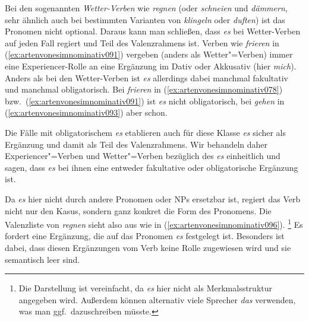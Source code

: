 
Bei den sogenannten \textit{Wetter-Verben} wie \textit{regnen} (oder \textit{schneien} und \textit{dämmern}, sehr ähnlich auch bei bestimmten Varianten von \textit{klingeln} oder \textit{duften}) ist das Pronomen nicht optional.
Daraus kann man schließen, dass \textit{es} bei Wetter-Verben auf jeden Fall regiert und Teil des Valenzrahmens ist.
Verben wie \textit{frieren} in (\ref{ex:artenvonesimnominativ091}) vergeben (anders als Wetter"=Verben) immer eine Experiencer-Rolle an eine Ergänzung im Dativ oder Akkusativ (hier \textit{mich}).
Anders als bei den Wetter-Verben ist \textit{es} allerdings dabei manchmal fakultativ und manchmal obligatorisch.
Bei \textit{frieren} in (\ref{ex:artenvonesimnominativ078}) bzw.\ (\ref{ex:artenvonesimnominativ091}) ist \textit{es} nicht obligatorisch, bei \textit{gehen} in (\ref{ex:artenvonesimnominativ093}) aber schon.


\begin{exe}
  \ex\label{ex:artenvonesimnominativ093}
  \begin{xlist}
  \end{xlist}
\end{exe}


Die Fälle mit obligatorischem \textit{es} etablieren auch für diese Klasse \textit{es} sicher als Ergänzung und damit als Teil des Valenzrahmens.
Wir behandeln daher Experiencer"=Verben und Wetter"=Verben bezüglich des \textit{es} einheitlich und sagen, dass \textit{es} bei ihnen eine entweder fakultative oder obligatorische Ergänzung ist.

Da \textit{es} hier nicht durch andere Pronomen oder NPs ersetzbar ist, regiert das Verb nicht nur den Kasus, sondern ganz konkret die Form des Pronomens.
Die Valenzliste von \textit{regnen} sieht also aus wie in (\ref{ex:artenvonesimnominativ096}).%
\footnote{Die Darstellung ist vereinfacht, da \textit{es} hier nicht als Merkmalsstruktur angegeben wird.
Außerdem können alternativ viele Sprecher \textit{das} verwenden, was man ggf.\ dazuschreiben müsste.}
Es fordert eine Ergänzung, die auf das Pronomen \textit{es} festgelegt ist.
Besonders ist dabei, dass diesen Ergänzungen vom Verb keine Rolle zugewiesen wird und sie semantisch leer sind.


\begin{exe}
\end{exe}



